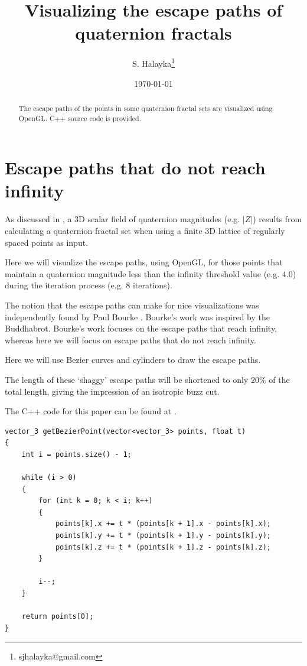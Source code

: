 \documentclass[12pt]{article}
\title{Visualizing the escape paths of quaternion fractals}
\author{S. Halayka\footnote{sjhalayka@gmail.com}}
\date{\today}
\begin{document}


\maketitle

\begin{abstract}
The escape paths of the points in some quaternion fractal sets are visualized using OpenGL. C++ source code is provided.
\end{abstract}


\section{Escape paths that do not reach infinity}

As discussed in \cite{halayka}, a 3D scalar field of quaternion magnitudes (e.g. $|Z|$) results from calculating a quaternion fractal set when using a finite 3D lattice of regularly spaced points as input.

Here we will visualize the escape paths, using OpenGL, for those points that maintain a quaternion magnitude less than the infinity threshold value (e.g. $4.0$) during the iteration process (e.g. $8$ iterations).

The notion that the escape paths can make for nice visualizations was independently found by Paul Bourke \cite{bourke}.
Bourke's work was inspired by the Buddhabrot.
Bourke's work focuses on the escape paths that reach infinity, whereas here we will focus on escape paths that do not reach infinity.

Here we will use Bezier curves and cylinders to draw the escape paths.

The length of these `shaggy' escape paths will be shortened to only $20\%$ of the total length, giving the impression of an isotropic buzz cut.

The C++ code for this paper can be found at \cite{halayka2}.


\begin{lstlisting}
vector_3 getBezierPoint(vector<vector_3> points, float t)
{
	int i = points.size() - 1;

	while (i > 0)
	{
		for (int k = 0; k < i; k++)
		{
			points[k].x += t * (points[k + 1].x - points[k].x);
			points[k].y += t * (points[k + 1].y - points[k].y);
			points[k].z += t * (points[k + 1].z - points[k].z);
		}

		i--;
	}

	return points[0];
}
\end{lstlisting}
\end{document}
